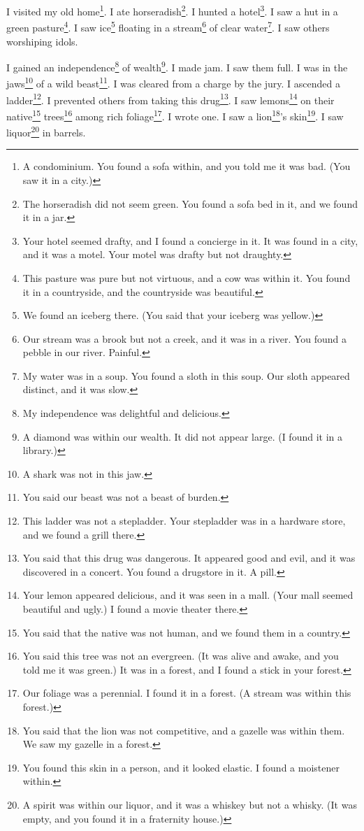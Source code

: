 \documentclass[12pt]{book}
\begin{document}
 I visited my old home\footnote{A condominium. You found a sofa within, and you told me it was bad. (You saw it in a city.)}. I ate horseradish\footnote{The horseradish did not seem green. You found a sofa bed in it, and we found it in a jar.}. I hunted a hotel\footnote{Your hotel seemed drafty, and I found a concierge in it. It was found in a city, and it was a motel. Your motel was drafty but not draughty.}. I saw a hut in a green pasture\footnote{This pasture was pure but not virtuous, and a cow was within it. You found it in a countryside, and the countryside was beautiful.}. I saw ice\footnote{We found an iceberg there. (You said that your iceberg was yellow.)} floating in a stream\footnote{Our stream was a brook but not a creek, and it was in a river. You found a pebble in our river. Painful.} of clear water\footnote{My water was in a soup. You found a sloth in this soup. Our sloth appeared distinct, and it was slow.}. I saw others worshiping idols. 

 I gained an independence\footnote{My independence was delightful and delicious.} of wealth\footnote{A diamond was within our wealth. It did not appear large. (I found it in a library.)}. I made jam. I saw them full. I was in the jaws\footnote{A shark was not in this jaw.} of a wild beast\footnote{You said our beast was not a beast of burden.}. I was cleared from a charge by the jury. I ascended a ladder\footnote{This ladder was not a stepladder. Your stepladder was in a hardware store, and we found a grill there.}. I prevented others from taking this drug\footnote{You said that this drug was dangerous. It appeared good and evil, and it was discovered in a concert. You found a drugstore in it. A pill.}. I saw lemons\footnote{Your lemon appeared delicious, and it was seen in a mall. (Your mall seemed beautiful and ugly.) I found a movie theater there.} on their native\footnote{You said that the native was not human, and we found them in a country.} trees\footnote{You said this tree was not an evergreen. (It was alive and awake, and you told me it was green.) It was in a forest, and I found a stick in your forest.} among rich foliage\footnote{Our foliage was a perennial. I found it in a forest. (A stream was within this forest.)}. I wrote one. I saw a lion\footnote{You said that the lion was not competitive, and a gazelle was within them. We saw my gazelle in a forest.}'s skin\footnote{You found this skin in a person, and it looked elastic. I found a moistener within.}. I saw liquor\footnote{A spirit was within our liquor, and it was a whiskey but not a whisky. (It was empty, and you found it in a fraternity house.)} in barrels. 
\end{document}
